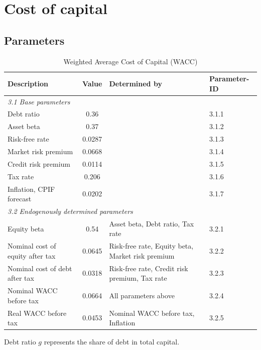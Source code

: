 \section{Cost of capital}

\subsection{Parameters}

\begin{table}[H]
\centering
\footnotesize
\begin{threeparttable}
\caption{Weighted Average Cost of Capital (WACC)}
\label{tab:wacc-parameters-reformed}
\begin{tabular}{@{}lcll@{}}
\toprule
\textbf{Description} & \textbf{Value} & \textbf{Determined by} & \textbf{Parameter-ID} \\
\midrule
\multicolumn{4}{l}{\textit{3.1 Base parameters}} \\
Debt ratio\tnote{a} & 0.36 & & 3.1.1 \\
Asset beta\tnote{b} & 0.37 & & 3.1.2 \\
Risk-free rate\tnote{c} & 0.0287 & & 3.1.3 \\
Market risk premium & 0.0668 & & 3.1.4 \\
Credit risk premium & 0.0114 & & 3.1.5 \\
Tax rate & 0.206 & & 3.1.6 \\
Inflation, CPIF forecast & 0.0202 & & 3.1.7 \\
\midrule
\multicolumn{4}{l}{\textit{3.2 Endogenously determined parameters}} \\
Equity beta\tnote{d} & 0.54 & Asset beta, Debt ratio, Tax rate & 3.2.1 \\
Nominal cost of equity after tax & 0.0645 & Risk-free rate, Equity beta, Market risk premium & 3.2.2 \\
Nominal cost of debt after tax & 0.0318 & Risk-free rate, Credit risk premium, Tax rate & 3.2.3 \\
Nominal WACC before tax & 0.0664 & All parameters above & 3.2.4 \\
Real WACC before tax & 0.0453 & Nominal WACC before tax, Inflation & 3.2.5 \\
\bottomrule
\end{tabular}
\begin{tablenotes}
\item[a] Debt ratio $g$ represents the share of debt in total capital.

\end{tablenotes}
\end{threeparttable}
\end{table}
